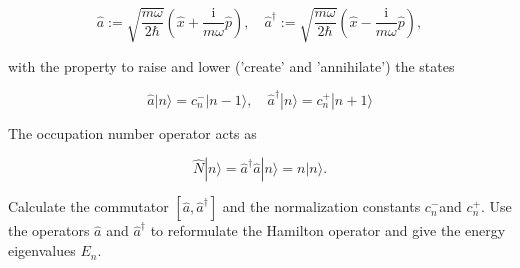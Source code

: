 $$
\hat{a}:=\sqrt{\frac{m \omega}{2 \hbar}}\left(\hat{x}+\frac{\mathrm{i}}{m \omega} \hat{p}\right), \quad \hat{a}^{\dagger}:=\sqrt{\frac{m \omega}{2 \hbar}}\left(\hat{x}-\frac{\mathrm{i}}{m \omega} \hat{p}\right),
$$

with the property to raise and lower ('create' and 'annihilate') the states

$$
\hat{a}|n\rangle=c_n^{-}|n-1\rangle, \quad \hat{a}^{\dagger}|n\rangle=c_n^{+}|n+1\rangle
$$


The occupation number operator acts as

$$
\hat{N}|n\rangle=\hat{a}^{\dagger} \hat{a}|n\rangle=n|n\rangle .
$$


Calculate the commutator $\left[\hat{a}, \hat{a}^{\dagger}\right]$ and the normalization constants $c_n^{-}$and $c_n^{+}$. Use the operators $\hat{a}$ and $\hat{a}^{\dagger}$ to reformulate the Hamilton operator and give the energy eigenvalues $E_n$.